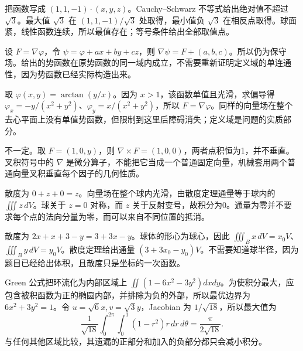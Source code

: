 \documentclass[12pt,fontset=fandol]{ctexart}
\begin{document}
\begin{solve}\label{ans:c45q19}
把函数写成 $(1,1,-1)\cdot(x,y,z)$。Cauchy--Schwarz 不等式给出绝对值不超过 $\sqrt3$。最大值 $\sqrt3$ 在 $(1,1,-1)/\sqrt3$ 处取得，最小值负 $\sqrt3$ 在相反点取得。球面紧，线性函数连续，所以最值存在；等号条件给出全部取值点。
\end{solve}

\begin{solve}\label{ans:c45q20}
设 $F=\nabla\varphi$，令 $\psi=\varphi+ax+by+cz$，则 $\nabla\psi=F+(a,b,c)$。所以仍为保守场。给出的势函数在原势函数的同一域内成立，不需要重新证明定义域的单连通性，因为势函数已经实际构造出来。
\end{solve}

\begin{solve}\label{ans:c45q21}
取 $\varphi(x,y)=\arctan(y/x)$。因为 $x>1$，该函数单值且光滑，求偏导得 $\varphi_x=-y/(x^2+y^2)$、$\varphi_y=x/(x^2+y^2)$，所以 $F=\nabla\varphi$。同样的向量场在整个去心平面上没有单值势函数，但限制到这里后障碍消失；定义域是问题的实质部分。
\end{solve}

\begin{solve}\label{ans:c45q22}
不一定。取 $F=(1,0,y)$，则 $\nabla\times F=(1,0,0)$，两者点积恒为1，并不垂直。叉积符号中的 $\nabla$ 是微分算子，不能把它当成一个普通固定向量，机械套用两个普通向量叉积垂直每个因子的几何性质。
\end{solve}

\begin{solve}\label{ans:c45q23}
散度为 $0+z+0=z$。向量场在整个球内光滑，由散度定理通量等于球内的 $\iiint z\,dV$。球关于 $z=0$ 对称，而 $z$ 关于反射变号，故积分为0。通量为零并不要求每个点的法向分量为零，而可以来自不同位置的抵消。
\end{solve}

\begin{solve}\label{ans:c45q24}
散度为 $2x+x+3-y=3+3x-y$。球体的形心为球心，因此 $\iiint_Bx\,dV=x_0V$、$\iiint_By\,dV=y_0V$。散度定理给出通量 $(3+3x_0-y_0)V$。不需要知道球半径，因为题目已经给出体积，且散度只是坐标的一次函数。
\end{solve}

\begin{solve}\label{ans:c45q25}
Green 公式把环流化为内部区域上 $\iint(1-6x^2-3y^2)dxdy$。为使积分最大，应包含被积函数为正的椭圆内部，并排除为负的外部，所以最优边界为 $6x^2+3y^2=1$。令 $u=\sqrt6x,v=\sqrt3y$，Jacobian 为 $1/\sqrt{18}$，所以最大值为\[\frac1{\sqrt{18}}\int_0^{2\pi}\int_0^1(1-r^2)r\,dr\,d\theta=\frac{\pi}{2\sqrt{18}}.\]与任何其他区域比较，其遗漏的正部分和加入的负部分都只会减小积分。
\end{solve}
\end{document}
